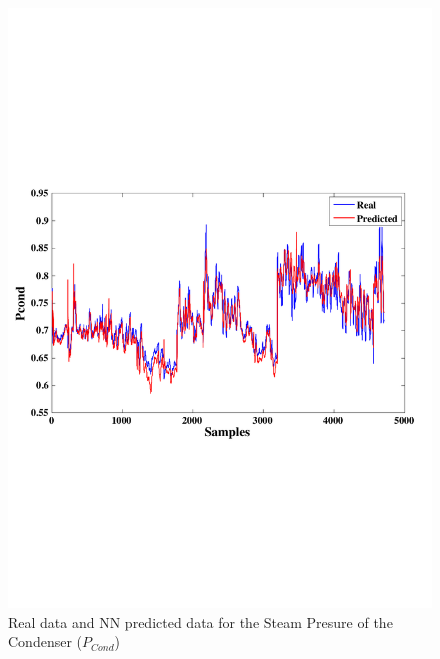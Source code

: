 \begin{figure}
\centering
\includegraphics[width=1\textwidth]{ANN-STcond.pdf}
\caption{Real data and NN predicted data for the Steam Presure of the Condenser  ($P_{Cond}$) }
\label{Pcond}
\end{figure}


